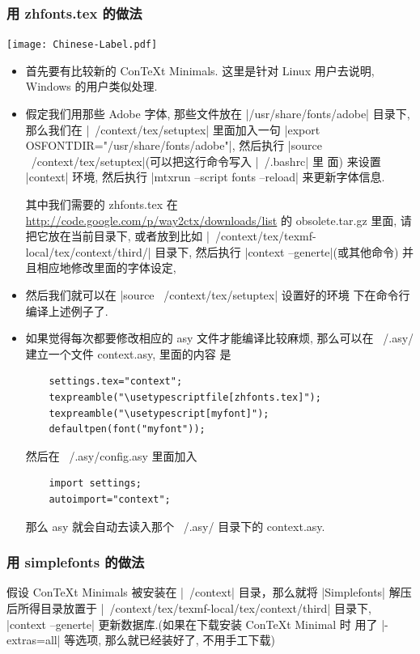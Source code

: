 \documentclass[nofonts,CJKnormalspaces]{ctexbook}[2009/05/20]
\begin{document}
\subsubsection{用 zhfonts.tex 的做法}
\begin{center}\texttt{[image: Chinese-Label.pdf]}\end{center}%

\begin{itemize}
\item 首先要有比较新的 ConTeXt  Minimals. 这里是针对 Linux 用户去说明,
  Windows 的用户类似处理.

\item 假定我们用那些 Adobe 字体, 那些文件放在 |/usr/share/fonts/adobe|
  目录下, 那么我们在   |~/context/tex/setuptex| 里面加入一句
  |export  OSFONTDIR="/usr/share/fonts/adobe"|, 然后执行
  |source  ~/context/tex/setuptex|(可以把这行命令写入 |~/.bashrc| 里
  面) 来设置 |context| 环境, 然后执行
  |mtxrun --script fonts --reload| 来更新字体信息.

  其中我们需要的 zhfonts.tex 在
  \url{http://code.google.com/p/way2ctx/downloads/list} 的
  obsolete.tar.gz 里面, 请把它放在当前目录下, 或者放到比如
  |~/context/tex/texmf-local/tex/context/third/| 目录下, 然后执行
  |context --generte|(或其他命令) 并且相应地修改里面的字体设定,

\item  然后我们就可以在 |source  ~/context/tex/setuptex| 设置好的环境
  下在命令行编译上述例子了.
\item 如果觉得每次都要修改相应的 asy 文件才能编译比较麻烦, 那么可以在
  ~/.asy/ 建立一个文件 context.asy, 里面的内容
  是  \label{ConTeXt:Settings}
  \begin{lstlisting}
    settings.tex="context";
    texpreamble("\usetypescriptfile[zhfonts.tex]");
    texpreamble("\usetypescript[myfont]");
    defaultpen(font("myfont"));
  \end{lstlisting}
  然后在 ~/.asy/config.asy 里面加入
  \begin{lstlisting}
    import settings;
    autoimport="context";
  \end{lstlisting}
  那么 asy 就会自动去读入那个 ~/.asy/ 目录下的 context.asy.
\end{itemize}
\subsubsection{用 simplefonts 的做法}
假设 ConTeXt Minimals 被安装在 |~/context| 目录，那么就将
|Simplefonts| 解压后所得目录放置于
|~/context/tex/texmf-local/tex/context/third| 目录下,
|context --generte| 更新数据库.(如果在下载安装 ConTeXt Minimal 时
用了 |-extras=all| 等选项, 那么就已经装好了, 不用手工下载)
\end{document}
